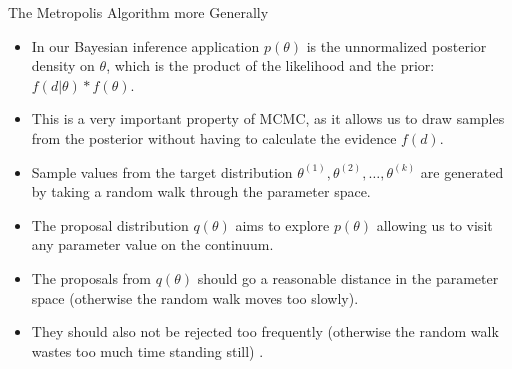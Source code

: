 \documentclass[handout]{beamer}
\begin{document}
\begin{frame}{The Metropolis Algorithm more Generally}
\scriptsize{

\begin{itemize}

\item In our Bayesian inference application $p(\theta)$ is the unnormalized posterior density on  $\theta$, which is the product of the likelihood and the prior: $f(d|\theta)*f(\theta)$.

\item This is a very important property of MCMC, as it allows us to draw samples from the posterior without having to calculate the evidence $f(d)$.

\item Sample values from the target distribution $\theta^{(1)},\theta^{(2)},\dots,\theta^{(k)}$ are generated by taking a random walk through the parameter space.

\item The proposal distribution $q(\theta)$ aims to explore $p(\theta)$ allowing us to visit any parameter value on the continuum.



\item The proposals from $q(\theta)$ should go a reasonable distance in the parameter space (otherwise the random walk moves too slowly).

\item They should also not be rejected too frequently (otherwise the random walk wastes too much time standing still) \cite{gelman2013bayesian}.



\end{itemize}


} 
\end{frame}
\end{document}
